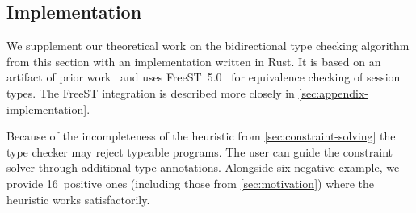 \subsection{Implementation}

We supplement our theoretical work on the bidirectional type checking algorithm
from this section with an implementation written in Rust. It is based on an
artifact of prior work~\cite{saffrich25:_artif_borrow_from_session_types} and
uses
FreeST~5.0~\cite{DBLP:journals/corr/abs-1904-01284,DBLP:journals/iandc/AlmeidaMTV22,
almeida26:_frees_concur_progr_languag_with} for equivalence checking of session
types. The FreeST integration is described more closely in
\cref{sec:appendix-implementation}.


Because of the incompleteness of the heuristic from
\cref{sec:constraint-solving} the type checker may reject typeable programs.
The user can guide the constraint solver through additional type annotations.
Alongside six negative example, we provide 16~positive ones (including those
from \cref{sec:motivation}) where the heuristic works satisfactorily.


